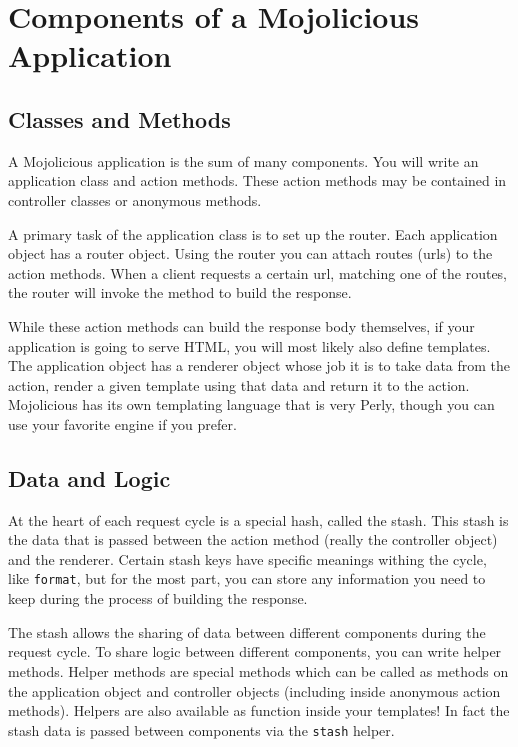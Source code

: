 \section{Components of a Mojolicious Application}

\subsection{Classes and Methods}

A Mojolicious application is the sum of many components.
You will write an application class and action methods.
These action methods may be contained in controller classes or anonymous methods.

A primary task of the application class is to set up the router.
Each application object has a router object.
Using the router you can attach routes (urls) to the action methods.
When a client requests a certain url, matching one of the routes, the router will invoke the method to build the response.

While these action methods can build the response body themselves, if your application is going to serve HTML, you will most likely also define templates.
The application object has a renderer object whose job it is to take data from the action, render a given template using that data and return it to the action.
Mojolicious has its own templating language that is very Perly, though you can use your favorite engine if you prefer.

\subsection{Data and Logic}

At the heart of each request cycle is a special hash, called the stash.
This stash is the data that is passed between the action method (really the controller object) and the renderer.
Certain stash keys have specific meanings withing the cycle, like \verb!format!, but for the most part, you can store any information you need to keep during the process of building the response.

The stash allows the sharing of data between different components during the request cycle.
To share logic between different components, you can write helper methods.
Helper methods are special methods which can be called as methods on the application object and controller objects (including inside anonymous action methods).
Helpers are also available as function inside your templates!
In fact the stash data is passed between components via the \verb!stash! helper.

